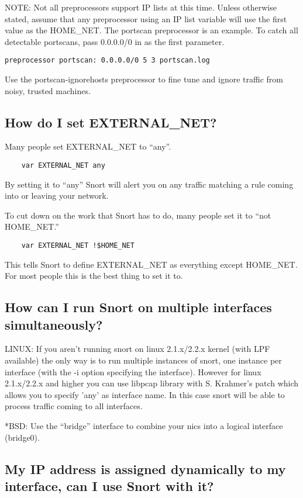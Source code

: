 \documentclass{article}
\begin{document}
NOTE: Not all preprocessors support IP lists at this time.  Unless
otherwise stated, assume that any preprocessor using an IP list variable
will use the first value as the HOME\_NET.  The portscan preprocessor
is an example.  To catch all detectable portscans, pass 0.0.0.0/0 in
as the first parameter.

\begin{verbatim}preprocessor portscan: 0.0.0.0/0 5 3 portscan.log\end{verbatim}

Use the portscan-ignorehosts preprocessor to fine tune and ignore
traffic from noisy, trusted machines.

\subsection{How do I set EXTERNAL\_NET?}

Many people set EXTERNAL\_NET to ``any''.
\begin{verbatim}
    var EXTERNAL_NET any
\end{verbatim}
By setting it to ``any'' Snort will alert you on any traffic matching a rule
coming into or leaving your network.

To cut down on the work that Snort has to do, many people set it to ``not
HOME\_NET.''
\begin{verbatim}
    var EXTERNAL_NET !$HOME_NET
\end{verbatim}
This tells Snort to define EXTERNAL\_NET as everything except HOME\_NET. For most
people this is the best thing to set it to.

\subsection{How can I run Snort on multiple interfaces simultaneously?}

LINUX: If you aren't running snort on linux 2.1.x/2.2.x kernel (with LPF
available) the only way is to run multiple instances of snort, one instance per
interface (with the -i option specifying the interface). However for linux
2.1.x/2.2.x and higher you can use libpcap library with S. Krahmer's patch
which allows you to specify 'any' as interface name. In this case snort will be
able to process traffic coming to all interfaces.

*BSD: Use the ``bridge'' interface to combine your nics into a logical
interface (bridge0).

\subsection{My IP address is assigned dynamically to my interface, can I use Snort with it?}
\end{document}
